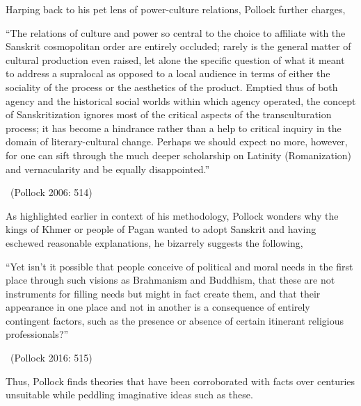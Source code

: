 Harping back to his pet lens of power-culture relations, Pollock further charges,

\begin{myquote}
“The relations of culture and power so central to the choice to affiliate with the Sanskrit cosmopolitan order are entirely occluded; rarely is the general matter of cultural production even raised, let alone the specific question of what it meant to address a supralocal as opposed to a local audience in terms of either the sociality of the process or the aesthetics of the product. Emptied thus of both agency and the historical social worlds within which agency operated, the concept of Sanskritization ignores most of the critical aspects of the transculturation process; it has become a hindrance rather than a help to critical inquiry in the domain of literary-cultural change. Perhaps we should expect no more, however, for one can sift through the much deeper scholarship on Latinity (Romanization) and vernacularity and be equally disappointed.” 

~\hfill (Pollock 2006: 514)
\end{myquote}

As highlighted earlier in context of his methodology, Pollock wonders why the kings of Khmer or people of Pagan wanted to adopt Sanskrit and having eschewed reasonable explanations, he bizarrely suggests the following,

\begin{myquote}
“Yet isn’t it possible that people conceive of political and moral needs in the first place through such visions as Brahmanism and Buddhism, that these are not instruments for filling needs but might in fact create them, and that their appearance in one place and not in another is a consequence of entirely contingent factors, such as the presence or absence of certain itinerant religious professionals?” 

~\hfill (Pollock 2016: 515)
\end{myquote}

\newpage

Thus, Pollock finds theories that have been corroborated with facts over centuries unsuitable while peddling imaginative ideas such as these.

